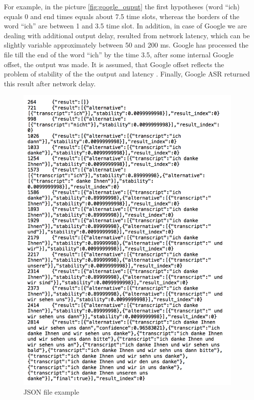 For example, in the picture  \ref {fig:google_ouput} the first hypotheses (word ``ich) equals 0
and end times equals about 7.5 time slots, whereas the borders of the word
``ich'' are between 1 and 3.5 time slot. In addition, in case of Google we are dealing with additional output delay,
resulted from network latency, which can be slightly variable approximately
between 50 and 200 ms. Google has processed the file till the end of the word
``ich'' by the time 3.5, after some internal Google offset, the output was made.
It is assumed, that Google offset reflects the problem of stability of the
the output and latency \parencite {mcgrawgrauenstein2012}. Finally, Google ASR returned this result after 
network delay.  
 \begin{figure}[htbp]
  \centering
   \includegraphics[width=1\textwidth]{images/json.png}
    \caption{JSON file example}
      \label{fig:json_ouput}
\end{figure}
